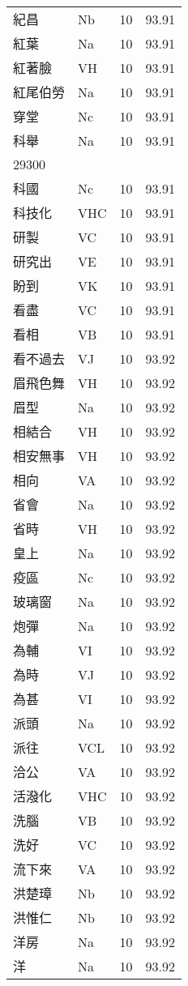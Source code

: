 \documentclass[twocolumn]{book}
\begin{document}
\begin{supertabular}{llrr}
紀昌 & Nb & 10 &  93.91\\
紅葉 & Na & 10 &  93.91\\
紅著臉 & VH & 10 &  93.91\\
紅尾伯勞 & Na & 10 &  93.91\\
穿堂 & Nc & 10 &  93.91\\
科舉 & Na & 10 &  93.91\\
29300\\
科國 & Nc & 10 &  93.91\\
科技化 & VHC & 10 &  93.91\\
研製 & VC & 10 &  93.91\\
研究出 & VE & 10 &  93.91\\
盼到 & VK & 10 &  93.91\\
看盡 & VC & 10 &  93.91\\
看相 & VB & 10 &  93.91\\
看不過去 & VJ & 10 &  93.92\\
眉飛色舞 & VH & 10 &  93.92\\
眉型 & Na & 10 &  93.92\\
相結合 & VH & 10 &  93.92\\
相安無事 & VH & 10 &  93.92\\
相向 & VA & 10 &  93.92\\
省會 & Na & 10 &  93.92\\
省時 & VH & 10 &  93.92\\
皇上 & Na & 10 &  93.92\\
疫區 & Nc & 10 &  93.92\\
玻璃窗 & Na & 10 &  93.92\\
炮彈 & Na & 10 &  93.92\\
為輔 & VI & 10 &  93.92\\
為時 & VJ & 10 &  93.92\\
為甚 & VI & 10 &  93.92\\
派頭 & Na & 10 &  93.92\\
派往 & VCL & 10 &  93.92\\
洽公 & VA & 10 &  93.92\\
活潑化 & VHC & 10 &  93.92\\
洗腦 & VB & 10 &  93.92\\
洗好 & VC & 10 &  93.92\\
流下來 & VA & 10 &  93.92\\
洪楚璋 & Nb & 10 &  93.92\\
洪惟仁 & Nb & 10 &  93.92\\
洋房 & Na & 10 &  93.92\\
洋 & Na & 10 &  93.92\\

\end{supertabular}
\end{document}
